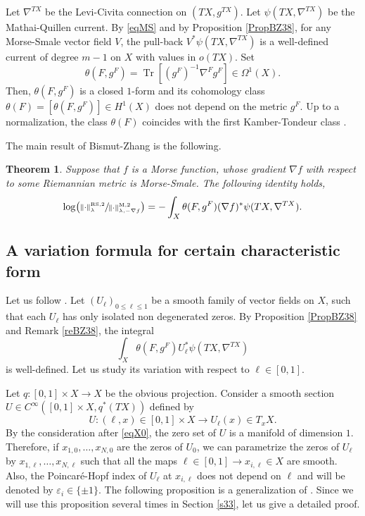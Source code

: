 \documentclass[11pt]{article}
\numberwithin{equation}{section}
\newcommand{\rM}{\mathrm{M}}
\newcommand{\RS}{\mathrm{RS}}
\theoremstyle{plain}
\newtheorem{thm}[lem]{Theorem}
\theoremstyle{definition}
\theoremstyle{remark}
\DeclareMathOperator{\Tr}{Tr}
\let\l\leqslant
\let\e\varepsilon
\begin{document}
Let $\nabla^{TX}$ be the Levi-Civita connection on $(TX,g^{TX})$. Let
$\psi(TX,\nabla^{TX})$ be the Mathai-Quillen current. By \eqref{eqMS} and by Proposition \ref{PropBZ38}, for any Morse-Smale vector field
$V$, the pull-back $V^{*}\psi(TX,\nabla^{TX})$ is a well-defined current of degree $m-1$ on $X$ with values in $o(TX)$.
Set
\begin{equation*}
\theta(F,g^{F})=\Tr[(g^{F})^{-1}\nabla^{F}g^{F}]\in
\Omega^{1}(X).
\end{equation*}
Then, $\theta(F,g^{F})$ is a closed $1$-form and its cohomology class
$\theta(F)=[\theta(F,g^{F})]\in H^{1}(X)$ does not depend on the
metric $g^F$. Up to a normalization, the class $\theta(F)$ coincides with the first Kamber-Tondeur class \cite{KamberTondeur74}.

\pagebreak[2]
The main result of Bismut-Zhang \cite[Th.\,0.2]{BZ92} is the following.

\begin{thm}\label{BZ}
Suppose that $f$ is a Morse function, whose gradient $\nabla f$ with respect to
some Riemannian metric is Morse-Smale. The following identity holds,
\begin{equation*}\label{eqBZ}
\log\bigl(\sfrac{\|{\cdot}\|^{\RS,2}_{\lambda}}{\|{\cdot}\|^{\rM,2}_{\lambda,-\nabla f}}\bigr)=-\int_{X}\theta(F,g^{F})(\nabla f)^{*}\psi(TX, \nabla ^{TX}).
\end{equation*}
\end{thm}

\subsection{A variation formula for certain characteristic
form}\label{sMa}Let us follow \cite[\S VI.a) and VI.b)]{BZ92}.
Let $(U_{\ell})_{0\l \ell\l 1}$ be a smooth family of vector fields
on $X$, such that each $U_{\ell}$ has only isolated non degenerated
zeros. By Proposition \ref{PropBZ38} and Remark \ref{reBZ38}, the integral
\begin{equation*}
\int_{X}\theta(F,g^{F})U_{\ell}^{*}\psi(TX, \nabla ^{TX})
\end{equation*}
is well-defined. Let us study its variation with respect to $\ell\in [0,1]$.

Let $q: [0,1]\times X\to X$ be the obvious projection. Consider a
smooth section $U\in C^{\infty}([0,1]\times X, q^{*}(TX))$ defined by
\begin{equation*}
U: (\ell,x)\in [0,1]\times X\to U_{\ell}(x)\in T_{x}X.
\end{equation*}
By the consideration after \eqref{eqX0}, the zero set of $U$ is a
manifold of dimension $1$.
Therefore, if $x_{1,0}, \ldots, x_{N,0}$ are the zeros of $U_{0}$,
we can parametrize the zeros of $U_{\ell}$ by
$x_{1,\ell},\ldots,x_{N,\ell}$ such that all the maps $\ell\in
[0,1]\to x_{i,\ell}\in X$ are
smooth. Also, the Poincaré-Hopf index of $U_{\ell}$ at
$x_{i,\ell}$ does not depend on $\ell$ and will be denoted by
$\e_{i}\in \{\pm1\}$. The following proposition is a generalization of \cite[Prop.\,6.4]{BZ92}. Since we will use this proposition several times in
Section \ref{s33}, let us give a detailed proof.
\end{document}

